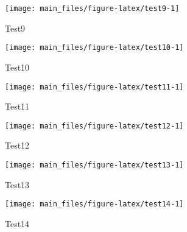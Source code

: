 \begin{Schunk}
\begin{figure}[H]

{\centering \texttt{[image: main\_files/figure-latex/test9-1]} 

}

\caption[Test9 ]{Test9 }\label{fig:test9}
\end{figure}
\end{Schunk}

\begin{Schunk}
\begin{figure}[H]

{\centering \texttt{[image: main\_files/figure-latex/test10-1]} 

}

\caption[Test10 ]{Test10 }\label{fig:test10}
\end{figure}
\end{Schunk}

\begin{Schunk}
\begin{figure}[H]

{\centering \texttt{[image: main\_files/figure-latex/test11-1]} 

}

\caption[Test11 ]{Test11 }\label{fig:test11}
\end{figure}
\end{Schunk}

\begin{Schunk}
\begin{figure}[H]

{\centering \texttt{[image: main\_files/figure-latex/test12-1]} 

}

\caption[Test12 ]{Test12 }\label{fig:test12}
\end{figure}
\end{Schunk}

\begin{Schunk}
\begin{figure}[H]

{\centering \texttt{[image: main\_files/figure-latex/test13-1]} 

}

\caption[Test13 ]{Test13 }\label{fig:test13}
\end{figure}
\end{Schunk}

\begin{Schunk}
\begin{figure}[H]

{\centering \texttt{[image: main\_files/figure-latex/test14-1]} 

}

\caption[Test14 ]{Test14 }\label{fig:test14}
\end{figure}
\end{Schunk}


